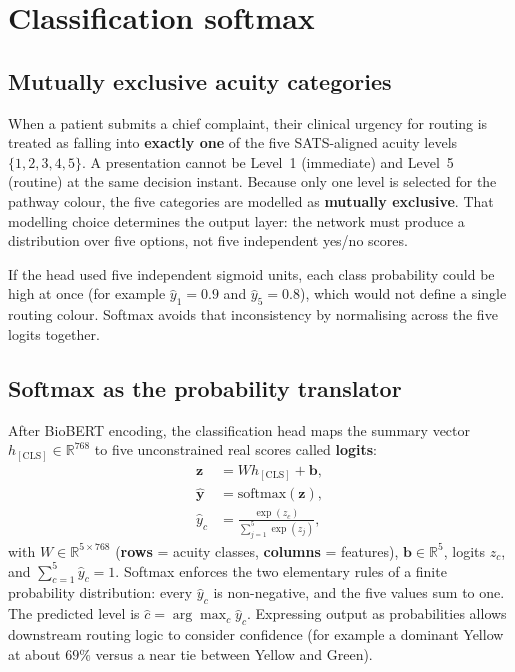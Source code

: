 \section{Classification softmax}
\label{sec:classification}

\subsection{Mutually exclusive acuity categories}

When a patient submits a chief complaint, their clinical urgency for routing is treated as falling into \textbf{exactly one} of the five SATS-aligned acuity levels \(\{1,2,3,4,5\}\). A presentation cannot be Level~1 (immediate) and Level~5 (routine) at the same decision instant. Because only one level is selected for the pathway colour, the five categories are modelled as \textbf{mutually exclusive}. That modelling choice determines the output layer: the network must produce a distribution over five options, not five independent yes/no scores.

If the head used five independent sigmoid units, each class probability could be high at once (for example \(\hat{y}_1=0.9\) and \(\hat{y}_5=0.8\)), which would not define a single routing colour. Softmax avoids that inconsistency by normalising across the five logits together.

\subsection{Softmax as the probability translator}

After BioBERT encoding, the classification head maps the summary vector \(h_{\mathrm{[CLS]}} \in \mathbb{R}^{768}\) to five unconstrained real scores called \textbf{logits}:
\begin{equation}
\begin{aligned}
  \mathbf{z} &= W h_{\mathrm{[CLS]}} + \mathbf{b}, \\
  \hat{\mathbf{y}} &= \mathrm{softmax}(\mathbf{z}), \\
  \hat{y}_c &= \frac{\exp(z_c)}{\sum_{j=1}^{5}\exp(z_j)},
\end{aligned}
  \label{eq:softmax-class}
\end{equation}
with \(W \in \mathbb{R}^{5 \times 768}\) (\textbf{rows} = acuity classes, \textbf{columns} = features), \(\mathbf{b} \in \mathbb{R}^{5}\), logits \(z_c\), and \(\sum_{c=1}^{5} \hat{y}_c = 1\). Softmax enforces the two elementary rules of a finite probability distribution: every \(\hat{y}_c\) is non-negative, and the five values sum to one. The predicted level is \(\hat{c} = \arg\max_c \hat{y}_c\). Expressing output as probabilities allows downstream routing logic to consider confidence (for example a dominant Yellow at about \(69\%\) versus a near tie between Yellow and Green).

